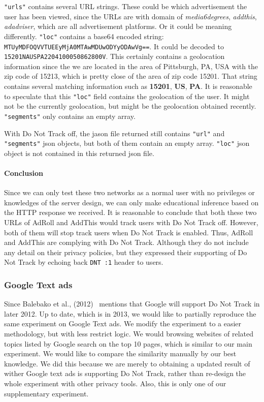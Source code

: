\documentclass{sig-alternate}
\begin{document}
\verb|"urls"| contains several URL strings. These could be which advertisement the user has been viewed, since the URLs are with domain of \emph{media6degrees}, \emph{addthis}, \emph{adadviser}, which are all advertisement platforms. Or it could be meaning differently. \verb|"loc"| contains a base64 encoded string: \verb|MTUyMDFOQVVTUEEyMjA0MTAwMDUwODYyODAwVg==|. It could be decoded to \verb|15201NAUSPA2204100050862800V|. This certainly contains a geolocation information since the we are located in the area of Pittsburgh, PA, USA with the zip code of 15213, which is pretty close of the area of zip code 15201. That string contains several matching information such as \textbf{15201}, \textbf{US}, \textbf{PA}. It is reasonable to speculate that this \verb|"loc"| field contains the geolocation of the user. It might not be the currently geolocation, but might be the geolocation obtained recently. \verb|"segments"| only contains an empty array.

With Do Not Track off, the jason file returned still contains \verb|"url"| and \verb|"segments"| json objects, but both of them contain an empty array. \verb|"loc"| json object is not contained in this returned json file.

\paragraph{Conclusion}

Since we can only test these two networks as a normal user with no privileges or knowledges of the server design, we can only make educational inference based on the HTTP response we received. It is reasonable to conclude that both these two URLs of AdRoll and AddThis would track users with Do Not Track off. However, both of them will stop track users when Do Not Track is enabled. Thus, AdRoll and AddThis are complying with Do Not Track. Although they do not include any detail on their privacy policies, but they expressed their supporting of Do Not Track by echoing back \verb|DNT :1| header to users.

\subsubsection{Google Text ads}
Since Balebako et al., (2012)~\cite{balebako2012measuring} mentions that Google will support Do Not Track in later 2012. Up to date, which is in 2013, we would like to partially reproduce the same experiment on Google Text ads. We modify the experiment to a easier methodology, but with less restrict logic. We would browsing websites of related topics listed by Google search on the top 10 pages, which is similar to our main experiment. We would like to compare the similarity manually by our best knowledge. We did this because we are merely to obtaining a updated result of wither Google text ads is supporting Do Not Track, rather than re-design the whole experiment with other privacy tools. Also, this is only one of our supplementary experiment.
\end{document}
